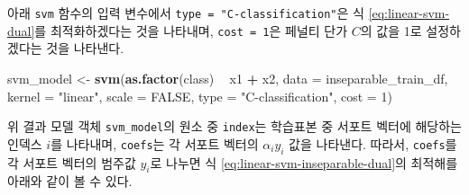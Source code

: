\documentclass[]{book}
\newenvironment{Shaded}{\begin{snugshade}}{\end{snugshade}}
\newcommand{\DataTypeTok}[1]{\textcolor[rgb]{0.13,0.29,0.53}{#1}}
\newcommand{\DecValTok}[1]{\textcolor[rgb]{0.00,0.00,0.81}{#1}}
\newcommand{\KeywordTok}[1]{\textcolor[rgb]{0.13,0.29,0.53}{\textbf{#1}}}
\newcommand{\NormalTok}[1]{#1}
\newcommand{\OperatorTok}[1]{\textcolor[rgb]{0.81,0.36,0.00}{\textbf{#1}}}
\newcommand{\OtherTok}[1]{\textcolor[rgb]{0.56,0.35,0.01}{#1}}
\newcommand{\StringTok}[1]{\textcolor[rgb]{0.31,0.60,0.02}{#1}}
\begin{document}
아래 \texttt{svm} 함수의 입력 변수에서 \texttt{type\ =\ "C-classification"}은 식 \eqref{eq:linear-svm-dual}를 최적화하겠다는 것을 나타내며, \texttt{cost\ =\ 1}은 페널티 단가 \(C\)의 값을 1로 설정하겠다는 것을 나타낸다.

\begin{Shaded}
\begin{Highlighting}[]
\NormalTok{svm_model <-}\StringTok{ }\KeywordTok{svm}\NormalTok{(}\KeywordTok{as.factor}\NormalTok{(class) }\OperatorTok{~}\StringTok{ }\NormalTok{x1 }\OperatorTok{+}\StringTok{ }\NormalTok{x2, }\DataTypeTok{data =}\NormalTok{ inseparable_train_df,}
                 \DataTypeTok{kernel =} \StringTok{"linear"}\NormalTok{, }\DataTypeTok{scale =} \OtherTok{FALSE}\NormalTok{,}
                 \DataTypeTok{type =} \StringTok{"C-classification"}\NormalTok{, }\DataTypeTok{cost =} \DecValTok{1}\NormalTok{)}
\end{Highlighting}
\end{Shaded}

위 결과 모델 객체 \texttt{svm\_model}의 원소 중 \texttt{index}는 학습표본 중 서포트 벡터에 해당하는 인덱스 \(i\)를 나타내며, \texttt{coefs}는 각 서포트 벡터의 \(\alpha_i y_i\) 값을 나타낸다. 따라서, \texttt{coefs}를 각 서포트 벡터의 범주값 \(y_i\)로 나누면 식 \eqref{eq:linear-svm-inseparable-dual}의 최적해를 아래와 같이 볼 수 있다.

\begin{Shaded}
\end{Shaded}
\end{document}
